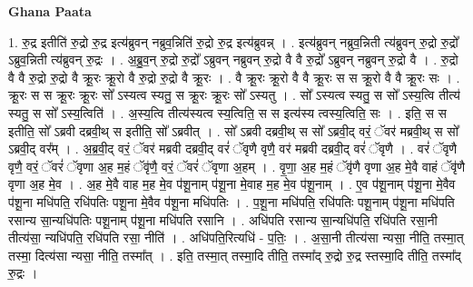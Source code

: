 \documentclass[17pt]{extarticle}
\begin{document}
\textbf{Ghana Paata } \newline

1. रु॒द्र इतीति॑ रु॒द्रो रु॒द्र इत्य॑ब्रुवन् नब्रुव॒न्निति॑ रु॒द्रो रु॒द्र इत्य॑ब्रुवन्न् । . इत्य॑ब्रुवन् नब्रुव॒न्निती त्य॑ब्रुवन् रु॒द्रो रु॒द्रो᳚ ऽब्रुव॒न्निती त्य॑ब्रुवन् रु॒द्रः । . अ॒ब्रु॒व॒न् रु॒द्रो रु॒द्रो᳚ ऽब्रुवन् नब्रुवन् रु॒द्रो वै वै रु॒द्रो᳚ ऽब्रुवन् नब्रुवन् रु॒द्रो वै । . रु॒द्रो वै वै रु॒द्रो रु॒द्रो वै क्रू॒रः क्रू॒रो वै रु॒द्रो रु॒द्रो वै क्रू॒रः । . वै क्रू॒रः क्रू॒रो वै वै क्रू॒रः स स क्रू॒रो वै वै क्रू॒रः सः । . क्रू॒रः स स क्रू॒रः क्रू॒रः सो᳚ ऽस्यत्व स्यतु॒ स क्रू॒रः क्रू॒रः सो᳚ ऽस्यतु । . सो᳚ ऽस्यत्व स्यतु॒ स सो᳚ ऽस्य॒त्वि तीत्य॑ स्यतु॒ स सो᳚ ऽस्य॒त्विति॑ । . अ॒स्य॒त्वि तीत्य॑स्यत्व स्य॒त्विति॒ स स इत्य॑स्य त्वस्य॒त्विति॒ सः । . इति॒ स स इतीति॒ सो᳚ ऽब्रवी दब्रवी॒थ् स इतीति॒ सो᳚ ऽब्रवीत् । . सो᳚ ऽब्रवी दब्रवी॒थ् स सो᳚ ऽब्रवी॒द् वरं॒ ॅवर॑ मब्रवी॒थ् स सो᳚ ऽब्रवी॒द् वर᳚म् । . अ॒ब्र॒वी॒द् वरं॒ ॅवर॑ मब्रवी दब्रवी॒द् वरं॑ ॅवृणै वृणै॒ वर॑ मब्रवी दब्रवी॒द् वरं॑ ॅवृणै । . वरं॑ ॅवृणै वृणै॒ वरं॒ ॅवरं॑ ॅवृणा अ॒ह म॒हं ॅवृ॑णै॒ वरं॒ ॅवरं॑ ॅवृणा अ॒हम् । . वृ॒णा॒ अ॒ह म॒हं ॅवृ॑णै वृणा अ॒ह मे॒वै वाहं ॅवृ॑णै वृणा अ॒ह मे॒व । . अ॒ह मे॒वै वाह म॒ह मे॒व प॑शू॒नाम् प॑शू॒ना मे॒वाह म॒ह मे॒व प॑शू॒नाम् । . ए॒व प॑शू॒नाम् प॑शू॒ना मे॒वैव प॑शू॒ना मधि॑पति॒ रधि॑पतिः पशू॒ना मे॒वैव प॑शू॒ना मधि॑पतिः । . प॒शू॒ना मधि॑पति॒ रधि॑पतिः पशू॒नाम् प॑शू॒ना मधि॑पति रसान्य सा॒न्यधि॑पतिः पशू॒नाम् प॑शू॒ना मधि॑पति रसानि । . अधि॑पति रसान्य सा॒न्यधि॑पति॒ रधि॑पति रसा॒नी तीत्य॑सा॒ न्यधि॑पति॒ रधि॑पति रसा॒ नीति॑ । . अधि॑पति॒रित्यधि॑ - प॒तिः॒ । . अ॒सा॒नी तीत्य॑सा न्यसा॒ नीति॒ तस्मा॒त् तस्मा॒ दित्य॑सा न्यसा॒ नीति॒ तस्मा᳚त् । . इति॒ तस्मा॒त् तस्मा॒दि तीति॒ तस्मा᳚द् रु॒द्रो रु॒द्र स्तस्मा॒दि तीति॒ तस्मा᳚द् रु॒द्रः । \newline
\end{document}
